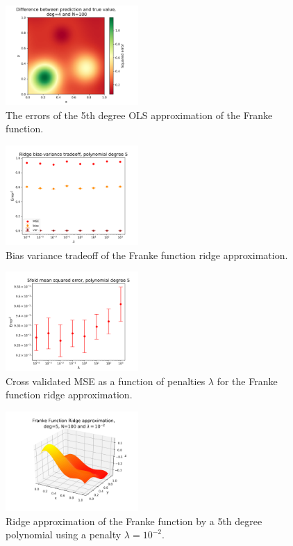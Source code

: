 \documentclass[notitlepage, reprint, nofootinbib]{revtex4-1}
\begin{document}
\begin{figure}
 	\centering
  	\includegraphics[width=0.45\textwidth]{../Figures/franke_OLS_error_deg4_N100.png}
  	\caption{The errors of the 5th degree OLS approximation of the Franke function.}
	\label{fig2}
\end{figure}

\begin{figure}
	\centering
	\includegraphics[width=0.45\textwidth]{../Figures/ridge_bias_variance_deg5.png}
	\caption{Bias variance tradeoff of the Franke function ridge approximation.}
	\label{fig6}
\end{figure}

\clearpage

\begin{figure}
	\centering
	\includegraphics[width=0.45\textwidth]{../Figures/ridge_kfold_deg5.png}
	\caption{Cross validated MSE as a function of penalties $\lambda$ for the Franke function ridge approximation.}
	\label{fig7}
\end{figure}

\begin{figure}
 	\centering
	\includegraphics[width=0.45\textwidth]{../Figures/franke_ridge_deg5_N100.png}
  	\caption{Ridge approximation of the Franke function by a 5th degree polynomial using a penalty $\lambda=10^{-2}$.}
	\label{fig8}
\end{figure}
\end{document}
